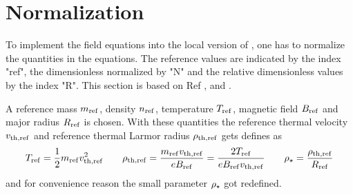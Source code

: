 \section{Normalization}
\label{sec:normalizationLocal}

To implement the field equations into the local version of {\gkw}, one has to normalize the quantities in the equations. The reference values are indicated by the index "ref", the dimensionless normalized by "N" and the relative dimensionless values by the index "R". This section is based on Ref ,  and .
\bigskip

A reference mass $m_\mathrm{ref}$, density $n_\mathrm{ref}$, temperature $T_\mathrm{ref}$, magnetic field $B_\mathrm{ref}$ and major radius $R_\mathrm{ref}$ is chosen. With these quantities the reference thermal velocity $v_{\mathrm{th},\mathrm{ref}}$ and reference thermal Larmor radius $\rho_{\mathrm{th},\mathrm{ref}}$ gets defines as
\begin{gather*}
    T_\mathrm{ref} = \frac{1}{2} m_\mathrm{ref} v_{\mathrm{th},\mathrm{ref}}^2 \qquad \rho_{\mathrm{th},\mathrm{ref}} = \frac{m_\mathrm{ref} v_{\mathrm{th},\mathrm{ref}}}{e B_\mathrm{ref}} = \frac{2 T_\mathrm{ref}}{e B_\mathrm{ref} v_{\mathrm{th},\mathrm{ref}}} \qquad  \rho_\star = \frac{\rho_{\mathrm{th},\mathrm{ref}}}{R_\mathrm{ref}}
\end{gather*}
and for convenience reason the small parameter $\rho_\star$ got redefined.
\bigskip


